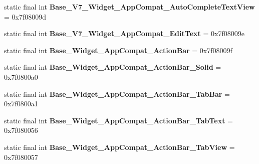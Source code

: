 \begin{DoxyCompactItemize}
\item 
\hypertarget{classandroid_1_1support_1_1v7_1_1appcompat_1_1_r_1_1style_a341274b28a1791a4d4de468f2937e268}{}static final int {\bfseries Base\+\_\+\+V7\+\_\+\+Widget\+\_\+\+App\+Compat\+\_\+\+Auto\+Complete\+Text\+View} = 0x7f08009d\label{classandroid_1_1support_1_1v7_1_1appcompat_1_1_r_1_1style_a341274b28a1791a4d4de468f2937e268}

\item 
\hypertarget{classandroid_1_1support_1_1v7_1_1appcompat_1_1_r_1_1style_ae17c6169562b437797c8ae9b247ef322}{}static final int {\bfseries Base\+\_\+\+V7\+\_\+\+Widget\+\_\+\+App\+Compat\+\_\+\+Edit\+Text} = 0x7f08009e\label{classandroid_1_1support_1_1v7_1_1appcompat_1_1_r_1_1style_ae17c6169562b437797c8ae9b247ef322}

\item 
\hypertarget{classandroid_1_1support_1_1v7_1_1appcompat_1_1_r_1_1style_a0bf1f7f1e1772ee2c55dc270ab6c9c13}{}static final int {\bfseries Base\+\_\+\+Widget\+\_\+\+App\+Compat\+\_\+\+Action\+Bar} = 0x7f08009f\label{classandroid_1_1support_1_1v7_1_1appcompat_1_1_r_1_1style_a0bf1f7f1e1772ee2c55dc270ab6c9c13}

\item 
\hypertarget{classandroid_1_1support_1_1v7_1_1appcompat_1_1_r_1_1style_a78e5768624be8e6fef216b3d4292c06d}{}static final int {\bfseries Base\+\_\+\+Widget\+\_\+\+App\+Compat\+\_\+\+Action\+Bar\+\_\+\+Solid} = 0x7f0800a0\label{classandroid_1_1support_1_1v7_1_1appcompat_1_1_r_1_1style_a78e5768624be8e6fef216b3d4292c06d}

\item 
\hypertarget{classandroid_1_1support_1_1v7_1_1appcompat_1_1_r_1_1style_aeadd677d9db8698be561b80a977d6d06}{}static final int {\bfseries Base\+\_\+\+Widget\+\_\+\+App\+Compat\+\_\+\+Action\+Bar\+\_\+\+Tab\+Bar} = 0x7f0800a1\label{classandroid_1_1support_1_1v7_1_1appcompat_1_1_r_1_1style_aeadd677d9db8698be561b80a977d6d06}

\item 
\hypertarget{classandroid_1_1support_1_1v7_1_1appcompat_1_1_r_1_1style_aaca3832573f385e5f197da3a0e9c5571}{}static final int {\bfseries Base\+\_\+\+Widget\+\_\+\+App\+Compat\+\_\+\+Action\+Bar\+\_\+\+Tab\+Text} = 0x7f080056\label{classandroid_1_1support_1_1v7_1_1appcompat_1_1_r_1_1style_aaca3832573f385e5f197da3a0e9c5571}

\item 
\hypertarget{classandroid_1_1support_1_1v7_1_1appcompat_1_1_r_1_1style_acc9a184f5947dff276d83a0e0c52f9cf}{}static final int {\bfseries Base\+\_\+\+Widget\+\_\+\+App\+Compat\+\_\+\+Action\+Bar\+\_\+\+Tab\+View} = 0x7f080057\label{classandroid_1_1support_1_1v7_1_1appcompat_1_1_r_1_1style_acc9a184f5947dff276d83a0e0c52f9cf}


\end{DoxyCompactItemize}
